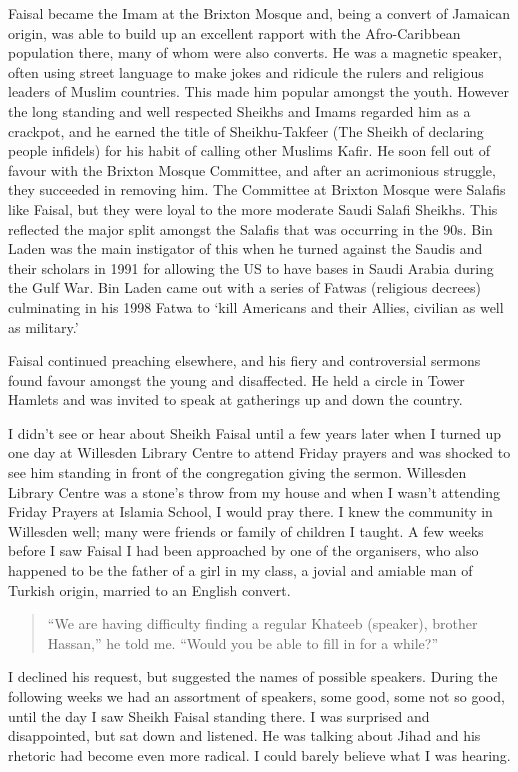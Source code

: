 \documentclass[12pt]{memoir}
\newcommand{\cor}[2]{#2} %
\def\–{-\hskip0pt}
\begin{document}
Faisal became the Imam at the Brixton Mosque and,
being a convert of Jamaican origin,
was able to build up an excellent rapport
with the Afro\–Caribbean population there, many of whom were also converts.
He was a magnetic speaker, often using street language to make jokes
and ridicule the rulers and religious leaders of Muslim countries.
This made him popular amongst the youth.
However the long standing and well respected Sheikhs and Imams
regarded him as a crackpot,
and he earned the title of Sheikhu-Takfeer
(The Sheikh of declaring people infidels)
for his habit of calling other Muslims Kafir.
He soon fell out of favour with the Brixton Mosque Committee,
and after an acrimonious struggle, they succeeded in removing him.
The Committee at Brixton Mosque were Salafis like Faisal,
but they were loyal to the more moderate Saudi Salafi Sheikhs.
This reflected the major split amongst the Salafis
that was occurring in the 90s.
Bin Laden was the main instigator of this when he turned against the Saudis
and their scholars in 1991 for allowing the US
to have bases in Saudi Arabia during the Gulf War.
Bin Laden came out with a series of Fatwas (religious decrees)
culminating in his 1998 Fatwa to
‘kill Americans and their Allies, civilian as well as military.’

Faisal continued preaching elsewhere,
and his fiery and controversial sermons found favour
amongst the young and disaffected.
He held a circle in Tower Hamlets and was invited to speak
at gatherings up and down the country.

I didn’t see or hear about Sheikh Faisal until a few years later
when I turned up one day at Willesden Library Centre to attend Friday prayers
and was shocked to see him standing in front of the congregation
giving the sermon.
Willesden Library Centre was a stone’s throw from my house
and when I wasn’t attending Friday Prayers at Islamia School,
I would pray there.
I knew the community in Willesden well;
many were friends or family of children I taught.
A few weeks before I saw Faisal I had been approached by one of the organisers,
who also happened to be the father of a girl in my class,
a jovial and amiable man of Turkish origin, married to an English convert.

\begin{quote}
“We are having difficulty finding a regular Khateeb (speaker),
brother Hassan,” he told me.
“Would you be able to fill in for a while?”
\end{quote}

I declined his request, but suggested the names of possible speakers.
During the following weeks we had an assortment of speakers, some good,
some not so good, until the day I saw \cor{Shiekh}{Sheikh} Faisal
standing there.
I was surprised and disappointed, but sat down and listened.
He was talking about Jihad and his rhetoric had become even more radical.
I could barely believe what I was hearing.
\end{document}
